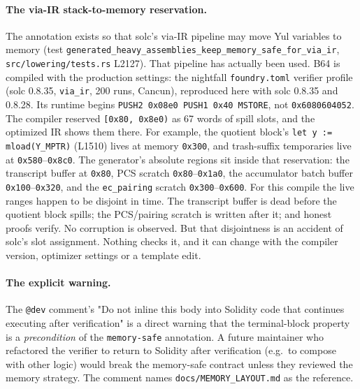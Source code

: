 \paragraph{The via-IR stack-to-memory reservation.} The
annotation exists so that solc's via-IR pipeline may move Yul
variables to memory (test \texttt{generated\_heavy\_\allowbreak{}assemblies\_keep\_\allowbreak{}memory\_safe\_\allowbreak{}for\_via\_ir},
\texttt{src/\allowbreak{}lowering/\allowbreak{}tests.rs} L2127). That pipeline has actually
been used. B64 is compiled with the production settings: the
nightfall \texttt{foundry.toml} verifier profile (solc 0.8.35,
\texttt{via\_ir}, 200 runs, Cancun), reproduced here with solc
0.8.35 and 0.8.28. Its runtime begins
\texttt{PUSH2 0x08e0 PUSH1 0x40 MSTORE}, not
\texttt{0x6080604052}. The compiler reserved
\texttt{[0x80, 0x8e0)} as 67 words of spill slots, and the optimized
IR shows them there. For example, the quotient block's
\texttt{let y := mload(Y\_\allowbreak{}MPTR)} (L1510) lives at memory
\texttt{0x300}, and trash-suffix temporaries live at
\texttt{0x580}--\texttt{0x8c0}. The generator's absolute regions sit
inside that reservation: the transcript buffer at
\texttt{0x80}, PCS scratch \texttt{0x80}--\texttt{0x1a0}, the
accumulator batch buffer \texttt{0x100}--\texttt{0x320}, and the
\texttt{ec\_pairing} scratch \texttt{0x300}--\texttt{0x600}. For
this compile the live ranges happen to be disjoint in time. The
transcript buffer is dead before the quotient block spills; the
PCS/pairing scratch is written after it; and honest proofs verify.
No corruption is observed. But that disjointness is an accident of
solc's slot assignment. Nothing checks it, and it can change with
the compiler version, optimizer settings or a template edit.

\paragraph{The explicit warning.} The \texttt{@dev} comment's
"Do not inline this body into Solidity code that continues
executing after verification" is a direct warning that the
terminal-block property is a \emph{precondition} of the
\texttt{memory-safe} annotation. A future maintainer who refactored
the verifier to return to Solidity after verification (e.g.\ to
compose with other logic) would break the memory-safe contract
unless they reviewed the memory strategy. The comment names
\texttt{docs/\allowbreak{}MEMORY\_\allowbreak{}LAYOUT.md} as the reference.

